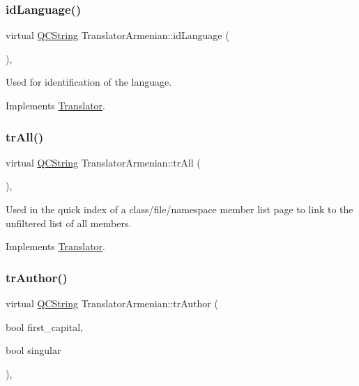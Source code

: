 \subsubsection{\texorpdfstring{idLanguage()}{idLanguage()}}
{\footnotesize\ttfamily virtual \mbox{\hyperlink{class_q_c_string}{Q\+C\+String}} Translator\+Armenian\+::id\+Language (\begin{DoxyParamCaption}{ }\end{DoxyParamCaption})\hspace{0.3cm}{\ttfamily [inline]}, {\ttfamily [virtual]}}

Used for identification of the language. 

Implements \mbox{\hyperlink{class_translator}{Translator}}.

\mbox{\label{class_translator_armenian_adf4f3e47ae22a05d4b450bebf4efd9f8}} 
\subsubsection{\texorpdfstring{trAll()}{trAll()}}
{\footnotesize\ttfamily virtual \mbox{\hyperlink{class_q_c_string}{Q\+C\+String}} Translator\+Armenian\+::tr\+All (\begin{DoxyParamCaption}{ }\end{DoxyParamCaption})\hspace{0.3cm}{\ttfamily [inline]}, {\ttfamily [virtual]}}

Used in the quick index of a class/file/namespace member list page to link to the unfiltered list of all members. 

Implements \mbox{\hyperlink{class_translator}{Translator}}.

\mbox{\label{class_translator_armenian_aa44bfef49e561d075a7be70c2db2e9b6}} 
\subsubsection{\texorpdfstring{trAuthor()}{trAuthor()}}
{\footnotesize\ttfamily virtual \mbox{\hyperlink{class_q_c_string}{Q\+C\+String}} Translator\+Armenian\+::tr\+Author (\begin{DoxyParamCaption}\item[{bool}]{first\+\_\+capital,  }\item[{bool}]{singular }\end{DoxyParamCaption})\hspace{0.3cm}{\ttfamily [inline]}, {\ttfamily [virtual]}}

